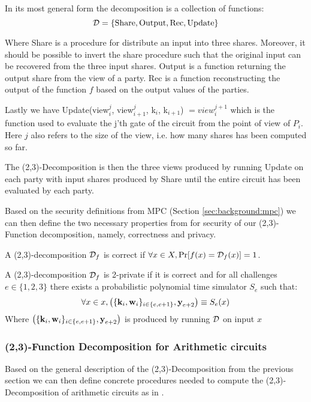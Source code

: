 \begin{definition}
  In its most general form the decomposition is a collection of functions:
  \[
    \mathcal{D} = \{\text{Share}, \text{Output}, \text{Rec}, \text{Update}\}
  \]

  Where Share is a procedure for distribute an input into three shares.
  Moreover, it should be possible to invert the share procedure such that the
  original input can be recovered from the three input shares.
  Output is a function returning the output share from the view of a party.
  Rec is a function reconstructing the output of the function $f$ based on the
  output values of the parties.

  Lastly we have Update(view$^{j}_{i}$, view$^{j}_{i+1}$, k$_{i}$, k$_{i+1}$) $= view^{j+1}_{i}$ which
  is the function used to evaluate the j'th gate of the circuit from the point
  of view of $P_{i}$. Here
  $j$ also refers to the size of the view, i.e. how many shares has been
  computed so far.
\end{definition}

The (2,3)-Decomposition is then the three views produced by running Update on
each party with input shares produced by Share until the entire circuit has been
evaluated by each party.

Based on the security definitions from MPC (Section \ref{sec:background:mpc}) we
can then define the two necessary properties from \cite{zkboo} for security of
our (2,3)-Function decomposition, namely, correctness and privacy.

\begin{definition}[Correctness]
\label{def:decomp_correctness}
A (2,3)-decomposition $\mathcal{D}_{f}$ is correct if
$\forall x \in X, \operatorname{Pr}[f(x) = \mathcal{D}_{f}(x)] = 1$.
\end{definition}

\begin{definition}[Privacy]
\label{def:decomp_privacy}
A (2,3)-decomposition $\mathcal{D}_{f}$ is 2-private if it is correct and for all challenges
$e \in \{1,2,3\}$ there exists a probabilistic polynomial time simulator $S_{e}$
such that:
\[
  \forall x \in x, \left(\{\textbf{k}_{i}, \textbf{w}_{i} \}_{i \in \{e, e+1\}}, \textbf{y}_{e+2} \right)
  \equiv S_{e}(x)
\]
Where $\left(\{\textbf{k}_{i}, \textbf{w}_{i} \}_{i \in \{e, e+1\}}, \textbf{y}_{e+2}
\right)$ is produced by running $\mathcal{D}$ on input $x$
\end{definition}

\subsubsection{(2,3)-Function Decomposition for Arithmetic circuits}
Based on the general description of the (2,3)-Decomposition from the previous
section we can then define concrete procedures needed to compute the
(2,3)-Decomposition of arithmetic circuits as in \citet{zkboo}.

